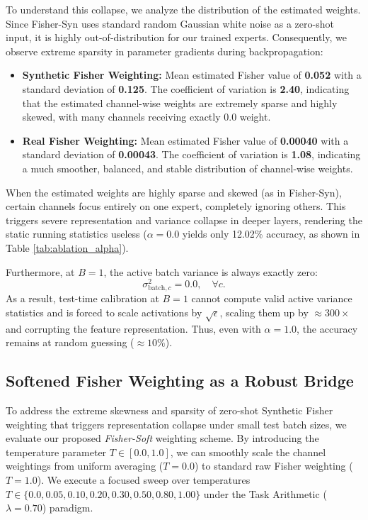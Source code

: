 \documentclass{article}
\theoremstyle{plain}
\theoremstyle{definition}
\theoremstyle{remark}
\begin{document}
To understand this collapse, we analyze the distribution of the estimated weights. Since Fisher-Syn uses standard random Gaussian white noise as a zero-shot input, it is highly out-of-distribution for our trained experts.
Consequently, we observe extreme sparsity in parameter gradients during backpropagation:
\begin{itemize}
    \item \textbf{Synthetic Fisher Weighting:} Mean estimated Fisher value of \textbf{0.052} with a standard deviation of \textbf{0.125}. The coefficient of variation is \textbf{2.40}, indicating that the estimated channel-wise weights are extremely sparse and highly skewed, with many channels receiving exactly 0.0 weight.
    \item \textbf{Real Fisher Weighting:} Mean estimated Fisher value of \textbf{0.00040} with a standard deviation of \textbf{0.00043}. The coefficient of variation is \textbf{1.08}, indicating a much smoother, balanced, and stable distribution of channel-wise weights.
\end{itemize}

When the estimated weights are highly sparse and skewed (as in Fisher-Syn), certain channels focus entirely on one expert, completely ignoring others. This triggers severe representation and variance collapse in deeper layers, rendering the static running statistics useless ($\alpha=0.0$ yields only 12.02\% accuracy, as shown in Table \ref{tab:ablation_alpha}). 

Furthermore, at $B=1$, the active batch variance is always exactly zero:
\begin{equation}
    \sigma^2_{\text{batch}, c} = 0.0, \quad \forall c.
\end{equation}
As a result, test-time calibration at $B=1$ cannot compute valid active variance statistics and is forced to scale activations by $\sqrt{\epsilon}$, scaling them up by $\approx 300\times$ and corrupting the feature representation. Thus, even with $\alpha=1.0$, the accuracy remains at random guessing ($\approx 10\%$).

\subsection{Softened Fisher Weighting as a Robust Bridge}
To address the extreme skewness and sparsity of zero-shot Synthetic Fisher weighting that triggers representation collapse under small test batch sizes, we evaluate our proposed \textit{Fisher-Soft} weighting scheme. By introducing the temperature parameter $T \in [0.0, 1.0]$, we can smoothly scale the channel weightings from uniform averaging ($T=0.0$) to standard raw Fisher weighting ($T=1.0$). We execute a focused sweep over temperatures $T \in \{0.0, 0.05, 0.10, 0.20, 0.30, 0.50, 0.80, 1.00\}$ under the Task Arithmetic ($\lambda=0.70$) paradigm.
\end{document}
